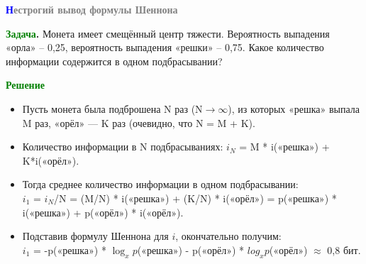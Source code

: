 \begin{frame}{\hspace{5cm}\textbf{\textcolor{blue}{Н}\textcolor{gray}{естрогий вывод формулы Шеннона}}}

    \fontsize{9pt}{11pt}\selectfont
    \setlength{\parindent}{3ex}
    
    \noindent\textbf{\textcolor{Green}{Задача}.} Монета имеет смещённый центр тяжести. Вероятность выпадения «орла» – 0,25, вероятность выпадения «решки» – 0,75. Какое количество информации содержится в одном подбрасывании?
    
    \bigskip
    
    \noindent\textbf{\textcolor{Green}{Решение}}
    
    \begin{itemize}
        \item Пусть монета была подброшена N раз (N$\to\infty$), из которых «решка» выпала M раз, «орёл» — K раз (очевидно, что N = M + K).
        \item Количество информации в N подбрасываниях: $i_N$ = M * i(«решка») + K*i(«орёл»).
        \item Тогда среднее количество информации в одном подбрасывании:\\$i_1$ = $i_N$/N = (M/N) * i(«решка») + (K/N) * i(«орёл») = p(«решка») * i(«решка») + p(«орёл») * i(«орёл»).
        \item Подставив формулу Шеннона для $i$, окончательно получим:\\
        $i_1$ = -p(«решка») * $\log_x p$(«решка») - p(«орёл») * $log_x p$(«орёл») $\approx$ 0,8 бит.
    \end{itemize}
    
\end{frame}